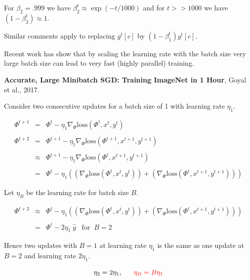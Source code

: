 {\vfill
For $\beta_2 = .999$ we have $\beta_2^t \approx \exp(-t/1000)$ and for $t >> 1000$ we have $(1-\beta_2^t) \approx 1$.

\vfill
Similar comments apply to replacing $g^t[c]$ by $(1-\beta_1^t)g^t[c]$.


Recent work has show that by scaling the learning rate with the batch size very large batch size can lead to very fast (highly parallel)
training.

\vfill
{\bf Accurate, Large Minibatch SGD: Training ImageNet in 1 Hour}, Goyal et al., 2017.


Consider two consecutive updates for a batch size of 1 with learning rate $\eta_1$.

\begin{eqnarray*}
  \Phi^{t+1} & = & \Phi^t - \eta_1 \nabla_\Phi \mathrm{loss}(\Phi^t,x^t,y^t) \\
  \\
  \Phi^{t+2} & = & \Phi^{t+1} - \eta_1 \nabla_\Phi \mathrm{loss}(\Phi^{t+1},x^{t+1},y^{t+1}) \\\
  \\
  & \approx & \Phi^{t+1} - \eta_1 \nabla_\Phi \mathrm{loss}(\Phi^t,x^{t+1},y^{t+1}) \\
  \\
  & = & \Phi^t - \eta_1((\nabla_\Phi \mathrm{loss}(\Phi^t,x^t,y^t)) + (\nabla_\Phi \mathrm{loss}(\Phi^t,x^{t+1},y^{t+1})))
\end{eqnarray*}


Let $\eta_B$ be the learning rate for batch size $B$.

\vfill
\begin{eqnarray*}
  \Phi^{t+2} & \approx & \Phi^t - \eta_1((\nabla_\Phi \mathrm{loss}(\Phi^t,x^t,y^t)) + (\nabla_\Phi \mathrm{loss}(\Phi^t,x^{t+1},y^{t+1}))) \\
  \\
  & = & \Phi^t - 2\eta_1\;\hat{g}\;\;\;\mathrm{for}\;\;B=2
\end{eqnarray*}

\vfill
Hence two updates with $B=1$ at learning rate $\eta_1$ is the same as one update at $B=2$ and learning rate $2\eta_1$.

\vfill
$$\eta_2 = 2\eta_1,\;\;\;\;\;\;{\color{red} \eta_B = B\eta_1}$$

}
